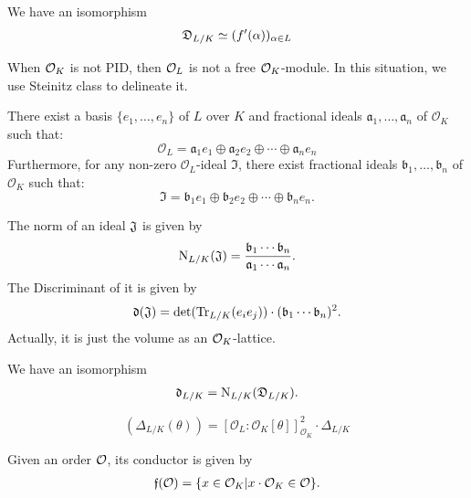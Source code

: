 {\begin{theorem}
    We have an isomorphism 
    \begin{align*}
        \mathfrak{D}_{L/K}\simeq  (f'(\alpha))_{\alpha\in L}
    \end{align*}
\end{theorem}

When $\mathcal{O}_K$ is not PID, then $\mathcal{O}_L$ is not a free $\mathcal{O}_K$-module. In this situation, we use Steinitz class to delineate it.
\begin{theorem}
    There exist a basis $\{e_1, \dots, e_n\}$ of $L$ over $K$ and fractional ideals $\mathfrak{a}_1, \dots, \mathfrak{a}_n$ of $\mathcal{O}_K$ such that:$$\mathcal{O}_L = \mathfrak{a}_1 e_1 \oplus \mathfrak{a}_2 e_2 \oplus \cdots \oplus \mathfrak{a}_n e_n$$Furthermore, for any non-zero $\mathcal{O}_L$-ideal $\mathfrak{I}$, there exist fractional ideals $\mathfrak{b}_1, \dots, \mathfrak{b}_n$ of $\mathcal{O}_K$ such that:$$\mathfrak{I} = \mathfrak{b}_1 e_1 \oplus \mathfrak{b}_2 e_2 \oplus \cdots \oplus \mathfrak{b}_n e_n.$$
\end{theorem}

\begin{definition}
    The norm of an ideal $\mathfrak{J}$ is given by 
    \begin{align*}
        \operatorname{N}_{L/K}(\mathfrak{J}) = \frac{\mathfrak{b}_1\cdots \mathfrak{b}_n}{\mathfrak{a}_1\cdots \mathfrak{a}_n}.
    \end{align*}
    The Discriminant of it is given by 
    \begin{align*}
        \mathfrak{d}(\mathfrak{J}) = \operatorname{det}(\operatorname{Tr}_{L/K}(e_ie_j))\cdot {(\mathfrak{b}_1\cdots \mathfrak{b}_n)^2}.
    \end{align*}
   Actually, it is just the volume as an $\mathcal{O}_K$-lattice. 
\end{definition}

\begin{theorem}
    We have an isomorphism 
    \begin{align*}
        \mathfrak{d}_{L/K} = \operatorname{N}_{L/K}(\mathfrak{D}_{L/K}).
    \end{align*}
\end{theorem}

\begin{theorem}
    $$(\Delta_{L/K}(\theta)) = [\mathcal{O}_L : \mathcal{O}_K[\theta]]_{\mathcal{O}_K}^2 \cdot \Delta_{L/K}$$
\end{theorem}


\begin{definition}
    Given an order $\mathcal{O}$, its conductor is given by 
    \begin{align*}
        \mathfrak{f}(\mathcal{O}) = \{x\in \mathcal{O}_K| x\cdot \mathcal{O}_K \in \mathcal{O}\}.
    \end{align*}
\end{definition}

}
